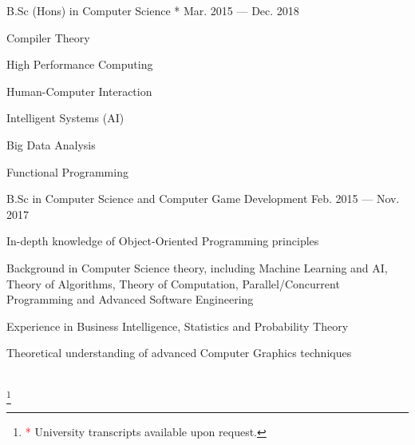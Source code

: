 
\begin{cventries}
  {B.Sc (Hons) in Computer Science *}
  {Mar. 2015 --- Dec. 2018}
  {}
  {
    \begin{cvitems}
      \item {Compiler Theory}
      \item {High Performance Computing}
      \item {Human-Computer Interaction}
      \item {Intelligent Systems (AI)}
      \item {Big Data Analysis}
      \item {Functional Programming}
    \end{cvitems}
  }

  {B.Sc in Computer Science and Computer Game Development}
  {Feb. 2015 --- Nov. 2017}
  {}
  {
    \begin{cvitems}
      \item {In-depth knowledge of Object-Oriented Programming principles}
      \item {Background in Computer Science theory, including Machine Learning and AI, Theory of Algorithms, Theory of Computation, Parallel/Concurrent Programming and Advanced Software Engineering}
      \item {Experience in Business Intelligence, Statistics and Probability Theory}
      \item {Theoretical understanding of advanced Computer Graphics techniques}
    \end{cvitems}
  }\\\vspace{5mm}\footnote{\textcolor{red}* University transcripts available upon request.}

\end{cventries}
